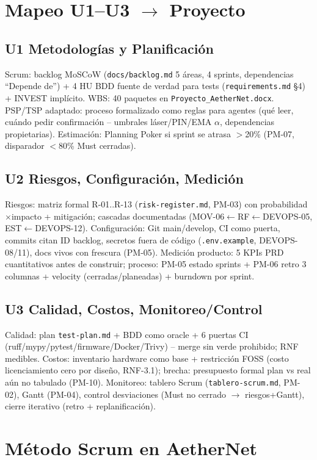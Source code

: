 \documentclass[conference]{IEEEtran}
\begin{document}
\section{Mapeo U1--U3 $\rightarrow$ Proyecto}
\subsection{U1 Metodologías y Planificación}
Scrum: backlog MoSCoW (\texttt{docs/backlog.md} 5 áreas, 4 sprints, dependencias ``Depende de'') + 4 HU BDD fuente de verdad para tests (\texttt{requirements.md} \S4) + INVEST implícito. WBS: 40 paquetes en \texttt{Proyecto\_AetherNet.docx}. PSP/TSP adaptado: proceso formalizado como reglas para agentes (qué leer, cuándo pedir confirmación -- umbrales láser/PIN/EMA $\alpha$, dependencias propietarias). Estimación: Planning Poker si sprint se atrasa $>$20\% (PM-07, disparador $<$80\% Must cerradas).

\subsection{U2 Riesgos, Configuración, Medición}
Riesgos: matriz formal R-01..R-13 (\texttt{risk-register.md}, PM-03) con probabilidad$\times$impacto + mitigación; cascadas documentadas (MOV-06$\leftarrow$RF$\leftarrow$DEVOPS-05, EST$\leftarrow$DEVOPS-12). Configuración: Git main/develop, CI como puerta, commits citan ID backlog, secretos fuera de código (\texttt{.env.example}, DEVOPS-08/11), docs vivos con frescura (PM-05). Medición producto: 5 KPIs PRD cuantitativos antes de construir; proceso: PM-05 estado sprints + PM-06 retro 3 columnas + velocity (cerradas/planeadas) + burndown por sprint.

\subsection{U3 Calidad, Costos, Monitoreo/Control}
Calidad: plan \texttt{test-plan.md} + BDD como oracle + 6 puertas CI (ruff/mypy/pytest/firmware/Docker/Trivy) -- merge sin verde prohibido; RNF medibles. Costos: inventario hardware como base + restricción FOSS (costo licenciamiento cero por diseño, RNF-3.1); brecha: presupuesto formal plan vs real aún no tabulado (PM-10). Monitoreo: tablero Scrum (\texttt{tablero-scrum.md}, PM-02), Gantt (PM-04), control desviaciones (Must no cerrado $\rightarrow$ riesgos+Gantt), cierre iterativo (retro + replanificación).

\section{Método Scrum en AetherNet}
\end{document}

